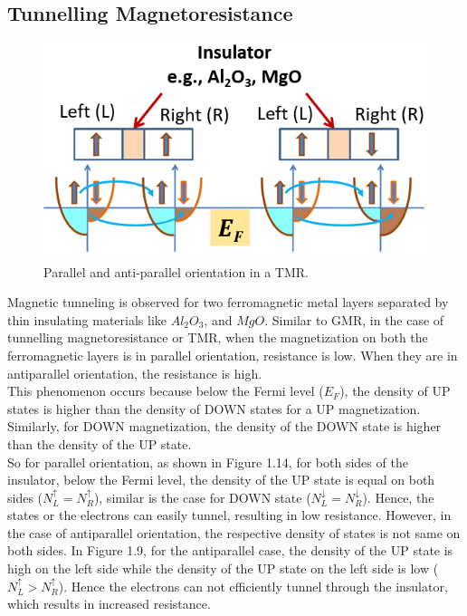 \documentclass[12pt,a4paper,bold]{thesis}
\theoremstyle{thm}
\theoremstyle{definition}
\begin{document}
\subsection{Tunnelling Magnetoresistance}
\begin{figure}[H]
	\centering
   \includegraphics[width=12cm]{Images/26.png} 
   \caption{Parallel and anti-parallel orientation in a TMR.}
\end{figure}
\indent \indent\indent Magnetic tunneling is observed for two ferromagnetic metal layers separated by thin insulating materials like $Al_2O_3$, and $MgO$. Similar to GMR, in the case of tunnelling magnetoresistance or TMR, when the magnetization on both the ferromagnetic layers is in parallel orientation, resistance is low. When they are in antiparallel orientation, the resistance is high. ~\cite{julliere1975tunneling,moodera1995large,RefWorks:786}\\
\indent \indent This phenomenon occurs because below the Fermi level ($E_F$), the density of UP states is higher than the density of DOWN states for a UP magnetization. Similarly, for DOWN magnetization, the density of the DOWN state is higher than the density of the UP state.\\
\indent \indent So for parallel orientation, as shown in Figure 1.14, for both sides of the insulator, below the Fermi level, the density of the UP state is equal on both sides ($N_L^{\uparrow}=N_R^{\uparrow}$), similar is the case for DOWN state ($N_L^{\downarrow}=N_R^{\downarrow}$). Hence, the states or the electrons can easily tunnel, resulting in low resistance. However, in the case of antiparallel orientation, the respective density of states is not same on both sides. In Figure 1.9, for the antiparallel case, the density of the UP state is high on the left side while the density of the UP state on the left side is low ($N_L^{\uparrow}>N_R^{\uparrow}$). Hence the electrons can not efficiently tunnel through the insulator, which results in increased resistance.~\cite{ RefWorks:300,miwa2014highly,RefWorks:33}\\
\end{document}
